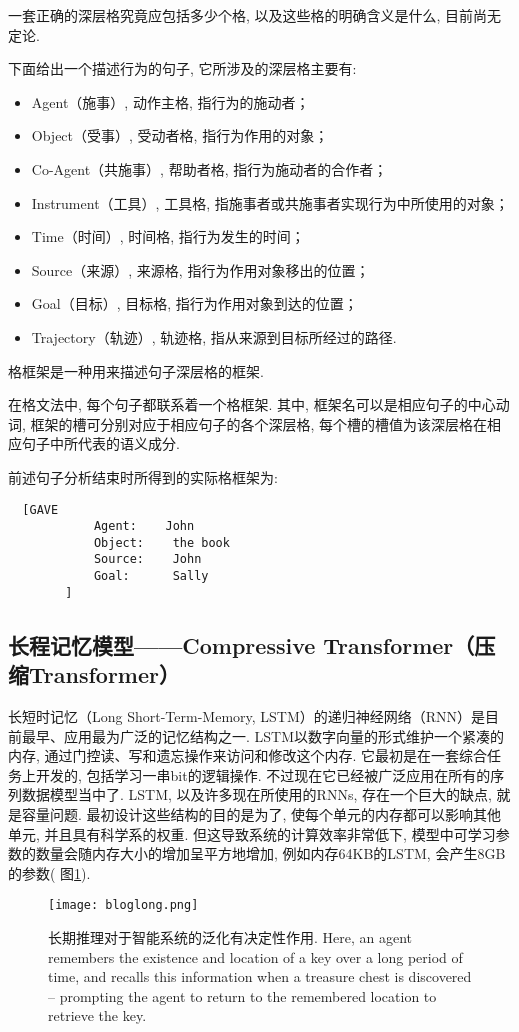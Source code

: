  一套正确的深层格究竟应包括多少个格, 以及这些格的明确含义是什么, 目前尚无定论.

下面给出一个描述行为的句子, 它所涉及的深层格主要有:
\begin{itemize}
\item Agent（施事）,  动作主格, 指行为的施动者；
\item Object（受事）, 受动者格, 指行为作用的对象；
\item Co-Agent（共施事）, 帮助者格, 指行为施动者的合作者；
\item Instrument（工具）, 工具格, 指施事者或共施事者实现行为中所使用的对象；
\item Time（时间）,   时间格, 指行为发生的时间；
\item Source（来源）, 来源格, 指行为作用对象移出的位置；
\item Goal（目标）,   目标格, 指行为作用对象到达的位置；
\item Trajectory（轨迹）, 轨迹格, 指从来源到目标所经过的路径.
\end{itemize}

格框架是一种用来描述句子深层格的框架.


在格文法中, 每个句子都联系着一个格框架. 其中, 框架名可以是相应句子的中心动词, 框架的槽可分别对应于相应句子的各个深层格, 每个槽的槽值为该深层格在相应句子中所代表的语义成分.

\begin{example}
前述句子分析结束时所得到的实际格框架为:
\begin{Verbatim}
  [GAVE
            Agent:    John
            Object:    the book
            Source:    John
            Goal:      Sally
        ]
\end{Verbatim}
\end{example}
\subsection{长程记忆模型——Compressive Transformer（压缩Transformer）}
长短时记忆（Long Short-Term-Memory, LSTM）的递归神经网络（RNN）是目前最早、应用最为广泛的记忆结构之一. LSTM以数字向量的形式维护一个紧凑的内存, 通过门控读、写和遗忘操作来访问和修改这个内存. 它最初是在一套综合任务上开发的, 包括学习一串bit的逻辑操作. 不过现在它已经被广泛应用在所有的序列数据模型当中了.
LSTM, 以及许多现在所使用的RNNs, 存在一个巨大的缺点, 就是容量问题. 最初设计这些结构的目的是为了, 使每个单元的内存都可以影响其他单元, 并且具有科学系的权重. 但这导致系统的计算效率非常低下, 模型中可学习参数的数量会随内存大小的增加呈平方地增加, 例如内存64KB的LSTM, 会产生8GB的参数( 图\ref{bloglong}).
\begin{figure}[H]
\centering
\texttt{[image: bloglong.png]}
\caption{长期推理对于智能系统的泛化有决定性作用. Here, an agent remembers the existence and location of a key over a long period of time, and recalls this information when a treasure chest is discovered – prompting the agent to return to the remembered location to retrieve the key.}
\label{bloglong}
\end{figure}

